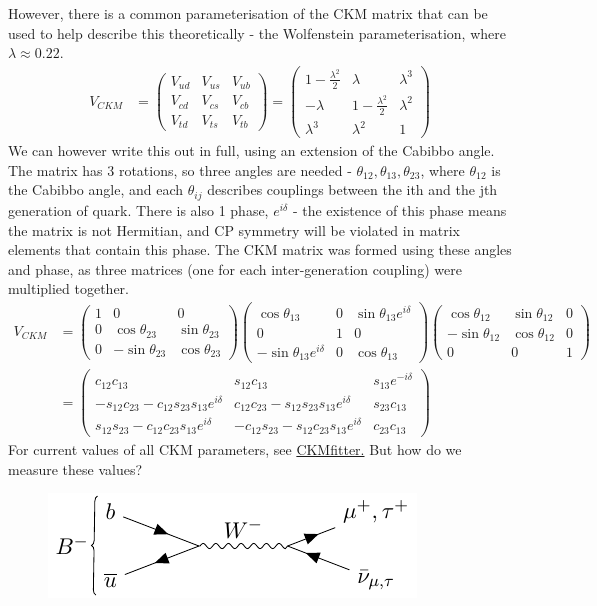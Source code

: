 \documentclass[a4paper, 11pt, normalem]{article}
\begin{document}
However, there is a common parameterisation of the CKM matrix that can be used to help describe this theoretically - the Wolfenstein parameterisation, where $\lambda\approx0.22$.
\begin{align}
    V_{CKM} &= \begin{pmatrix} V_{ud} & V_{us} & V_{ub} \\ V_{cd} & V_{cs} & V_{cb} \\ V_{td} & V_{ts} & V_{tb}\end{pmatrix} = \begin{pmatrix} 1-\frac{\lambda^2}{2} & \lambda & \lambda^3 \\ -\lambda & 1-\frac{\lambda^2}{2} & \lambda^2 \\ \lambda^3 & \lambda^2 & 1\end{pmatrix}
\end{align}
We can however write this out in full, using an extension of the Cabibbo angle.
The matrix has 3 rotations, so three angles are needed - $\theta_{12},\theta_{13},\theta_{23}$, where $\theta_{12}$ is the Cabibbo angle, and each $\theta_{ij}$ describes couplings between the ith and the jth generation of quark. 
There is also 1 phase, $e^{i\delta}$ - the existence of this phase means the matrix is not Hermitian, and CP symmetry will be violated in matrix elements that contain this phase. 
The CKM matrix was formed using these angles and phase, as three matrices (one for each inter-generation coupling) were multiplied together.
\begin{align}
    V_{CKM} &= \begin{pmatrix} 1 & 0 & 0 \\ 0 & \cos\theta_{23} & \sin\theta_{23} \\ 0 & -\sin\theta_{23} & \cos\theta_{23} \end{pmatrix}\begin{pmatrix} \cos\theta_{13} & 0 & \sin\theta_{13}e^{i\delta} \\ 0 & 1 & 0 \\ -\sin\theta_{13}e^{i\delta} & 0 & \cos\theta_{13}\end{pmatrix}\begin{pmatrix}\cos\theta_{12} & \sin\theta_{12} & 0 \\ -\sin\theta_{12} & \cos\theta_{12} & 0 \\ 0 & 0 & 1 \end{pmatrix}\\
            &= \begin{pmatrix} c_{12}c_{13} & s_{12}c_{13} & s_{13}e^{-i\delta} \\ -s_{12}c_{23}-c_{12}s_{23}s_{13}e^{i\delta} & c_{12}c_{23} - s_{12}s_{23}s_{13}e^{i\delta} & s_{23}c_{13} \\ s_{12}s_{23}-c_{12}c_{23}s_{13}e^{i\delta} & -c_{12}s_{23}-s_{12}c_{23}s_{13}e^{i\delta} & c_{23}c_{13}\end{pmatrix}
\end{align}
For current values of all CKM parameters, see \href{https://ckmfitter.in2p3.fr}{CKMfitter.}
But how do we measure these values?
\begin{figure}[H]
    \centering
    \includegraphics{ckm_bmin.pdf}
\end{figure}
\end{document}
